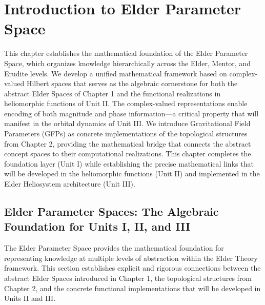 \chapter{Introduction to Elder Parameter Space}

\begin{tcolorbox}[colback=DarkSkyBlue!5!white,colframe=DarkSkyBlue!75!black,title=Chapter Summary]
This chapter establishes the mathematical foundation of the Elder Parameter Space, which organizes knowledge hierarchically across the Elder, Mentor, and Erudite levels. We develop a unified mathematical framework based on complex-valued Hilbert spaces that serves as the algebraic cornerstone for both the abstract Elder Spaces of Chapter 1 and the functional realizations in heliomorphic functions of Unit II. The complex-valued representations enable encoding of both magnitude and phase information—a critical property that will manifest in the orbital dynamics of Unit III. We introduce Gravitational Field Parameters (GFPs) as concrete implementations of the topological structures from Chapter 2, providing the mathematical bridge that connects the abstract concept spaces to their computational realizations. This chapter completes the foundation layer (Unit I) while establishing the precise mathematical links that will be developed in the heliomorphic functions (Unit II) and implemented in the Elder Heliosystem architecture (Unit III).
\end{tcolorbox}

\section{Elder Parameter Spaces: The Algebraic Foundation for Units I, II, and III}

The Elder Parameter Space provides the mathematical foundation for representing knowledge at multiple levels of abstraction within the Elder Theory framework. This section establishes explicit and rigorous connections between the abstract Elder Spaces introduced in Chapter 1, the topological structures from Chapter 2, and the concrete functional implementations that will be developed in Units II and III.

